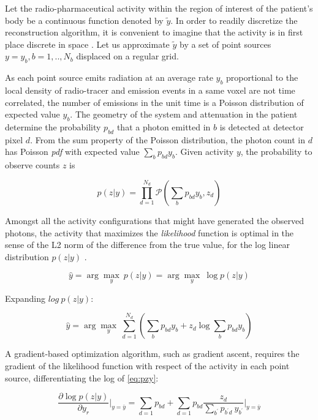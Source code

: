 \documentclass[12pt,a4paper]{report}
\begin{document}
Let the radio-pharmaceutical activity within the region of interest of the patient's body be a continuous function 
denoted by $\tilde{y}$. 
In order to readily discretize the reconstruction algorithm, it is convenient to imagine that the activity is in first place 
discrete in space \cite{shepp_1982}. 
Let us approximate $\tilde{y}$ by a set of point sources $y=y_{b}, b=1,..,N_{b}$ displaced on a regular grid.

\noindent As each point source emits radiation at an average rate $y_{b}$ proportional to the local density of radio-tracer 
and emission events in a same voxel are not time correlated, the number of emissions in the unit time is a Poisson 
distribution of expected value $y_{b}$. The geometry of the system and attenuation in the patient 
determine the probability $p_{bd}$ that a photon emitted in $b$ is detected at detector pixel $d$.
From the sum property of the Poisson distribution, the photon count in $d$ has Poisson \textit{pdf} 
with expected value $\sum_{b}p_{bd}y_{b}$. 
Given activity $y$, the probability to observe counts $z$ is 


\begin{equation}
 \label{eq:pzy}
 p(z|y) = \prod_{d=1}^{N_{d}}{\mathcal{P}(\sum_{b}p_{bd}y_{b}, z_d)}
\end{equation}

\noindent Amongst all the activity configurations that might have generated the observed photons, 
the activity that maximizes the \textit{likelihood} function is optimal 
in the sense of the L2 norm of the difference from the true value, for the log linear distribution $p(z|y)$ \cite{cramer_1957}.

\begin{equation}
 \label{eq:y}
 \hat{y} = \arg\max_y\ p(z|y) = \arg\max_y\ \log{p(z|y)}
\end{equation}

\noindent Expanding $log{\ p(z|y)}$:

\begin{equation}
 \label{eq:y2}
 \hat{y} = \arg\max_y\ \sum_{d=1}^{N_{d}}\left( \sum_{b}p_{bd}y_{b} + z_{d} \log\sum_{b}p_{bd}y_{b}\right)
\end{equation}

\noindent A gradient-based optimization algorithm, such as gradient ascent, requires the gradient of the likelihood function 
with respect of the activity in each point source, differentiating the log of \ref{eq:pzy}:

\begin{equation}
 \label{eq:pro}
 \frac{\partial \log p(z|y)}{\partial y_{r}}\vert_{y=\bar{y}} = \sum_{d=1}{p_{bd}} + \sum_{d=1}p_{bd}{\frac{z_d}{ \sum_{b^{\prime}}p_{b^{\prime}d}\ y_{b^{\prime}} }}\vert_{y=\bar{y}}
\end{equation}
\end{document}
